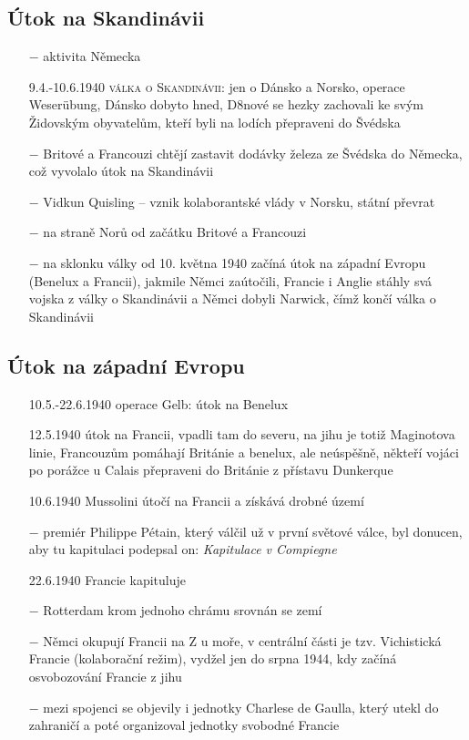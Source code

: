 \documentclass{article}
\begin{document}
\subsection*{Útok na Skandinávii}
\begin{itemize}
    \vspace{-0.5em}
    \setlength\itemsep{0.15em}
    \item[$-$] aktivita Německa
    \item[9.4.-10.6.1940] \textsc{válka o Skandinávii}: jen o Dánsko a Norsko, operace Weserübung, Dánsko dobyto hned, D8nové se hezky zachovali ke svým Židovským obyvatelům, kteří  byli na lodích přepraveni do Švédska
    \item[$-$] Britové a Francouzi chtějí zastavit dodávky železa ze Švédska do Německa, což vyvolalo útok na Skandinávii
    \item[$-$] Vidkun Quisling -- vznik kolaborantské vlády v Norsku, státní převrat
    \item[$-$] na straně Norů od začátku Britové a Francouzi
    \item[$-$] na sklonku války od 10. května 1940 začíná útok na západní Evropu (Benelux a Francii), jakmile Němci zaútočili, Francie i Anglie stáhly svá vojska z války o Skandinávii a Němci dobyli Narwick, čímž končí válka o Skandinávii
\end{itemize}

\subsection*{Útok na západní Evropu}
\begin{itemize}
    \vspace{-0.5em}
    \setlength\itemsep{0.15em}
    \item[10.5.-22.6.1940] operace Gelb: útok na Benelux
    \item[12.5.1940] útok na Francii, vpadli tam do severu, na jihu je totiž Maginotova linie, Francouzům pomáhají Británie a benelux, ale neúspěšně, někteří vojáci po porážce u Calais přepraveni do Británie z přístavu Dunkerque
    \item[10.6.1940] Mussolini útočí na Francii a získává drobné území
    \item[$-$] premiér Philippe Pétain, který válčil už v první světové válce, byl donucen, aby tu kapitulaci podepsal on: \textit{Kapitulace v Compiegne}
    \item[22.6.1940] Francie kapituluje
    \item[$-$] Rotterdam krom jednoho chrámu srovnán se zemí
    \item[$-$] Němci okupují Francii na Z u moře, v centrální části je tzv. Vichistická Francie (kolaborační režim), vydžel jen do srpna 1944, kdy začíná osvobozování Francie z jihu
    \item[$-$] mezi spojenci se objevily i jednotky Charlese de Gaulla, který utekl do zahraničí a poté organizoval jednotky svobodné Francie
\end{itemize}
\end{document}
